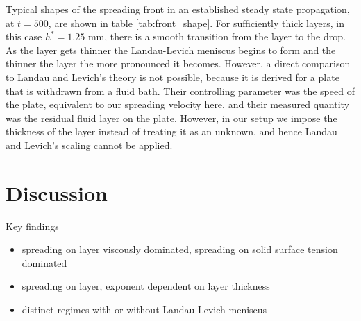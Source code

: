 \documentclass[aip,graphicx]{revtex4-1}
\begin{document}
Typical shapes of the spreading front in an established steady state propagation, at $t=500$, are shown in table \ref{tab:front_shape}.
For sufficiently thick layers, in this case $h^*=1.25$ mm, there is a smooth transition from the layer to the drop.
As the layer gets thinner the Landau-Levich meniscus \cite{maleki2011landau} begins to form and the thinner the layer the more pronounced it becomes.
However, a direct comparison to Landau and Levich's theory is not possible, because it is derived for a plate that is withdrawn from a fluid bath.
Their controlling parameter was the speed of the plate, equivalent to our spreading velocity here, and their measured quantity was the residual fluid layer on the plate.
However, in our setup we impose the thickness of the layer instead of treating it as an unknown, and hence Landau and Levich's scaling cannot be applied.


\section{Discussion}

Key findings

\begin{itemize}
 \item spreading on layer viscously dominated, spreading on solid surface tension dominated
 \item spreading on layer, exponent dependent on layer thickness
 \item distinct regimes with or without Landau-Levich meniscus
\end{itemize}



%
%
\end{document}
